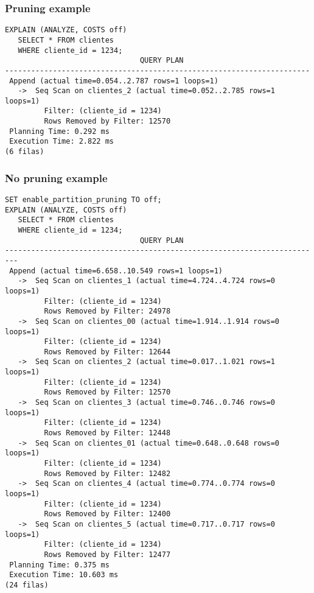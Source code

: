 \begin{frame}[fragile]
  \frametitle{Pruning example}
\footnotesize
\begin{lstlisting}
EXPLAIN (ANALYZE, COSTS off)
   SELECT * FROM clientes
   WHERE cliente_id = 1234;
                               QUERY PLAN                               
----------------------------------------------------------------------
 Append (actual time=0.054..2.787 rows=1 loops=1)
   ->  Seq Scan on clientes_2 (actual time=0.052..2.785 rows=1 loops=1)
         Filter: (cliente_id = 1234)
         Rows Removed by Filter: 12570
 Planning Time: 0.292 ms
 Execution Time: 2.822 ms
(6 filas)
\end{lstlisting}
\end{frame}

\begin{frame}[fragile]
  \frametitle{No pruning example}
\footnotesize
\begin{lstlisting}
SET enable_partition_pruning TO off;
EXPLAIN (ANALYZE, COSTS off)
   SELECT * FROM clientes
   WHERE cliente_id = 1234;
                               QUERY PLAN                                
-------------------------------------------------------------------------
 Append (actual time=6.658..10.549 rows=1 loops=1)
   ->  Seq Scan on clientes_1 (actual time=4.724..4.724 rows=0 loops=1)
         Filter: (cliente_id = 1234)
         Rows Removed by Filter: 24978
   ->  Seq Scan on clientes_00 (actual time=1.914..1.914 rows=0 loops=1)
         Filter: (cliente_id = 1234)
         Rows Removed by Filter: 12644
   ->  Seq Scan on clientes_2 (actual time=0.017..1.021 rows=1 loops=1)
         Filter: (cliente_id = 1234)
         Rows Removed by Filter: 12570
   ->  Seq Scan on clientes_3 (actual time=0.746..0.746 rows=0 loops=1)
         Filter: (cliente_id = 1234)
         Rows Removed by Filter: 12448
   ->  Seq Scan on clientes_01 (actual time=0.648..0.648 rows=0 loops=1)
         Filter: (cliente_id = 1234)
         Rows Removed by Filter: 12482
   ->  Seq Scan on clientes_4 (actual time=0.774..0.774 rows=0 loops=1)
         Filter: (cliente_id = 1234)
         Rows Removed by Filter: 12400
   ->  Seq Scan on clientes_5 (actual time=0.717..0.717 rows=0 loops=1)
         Filter: (cliente_id = 1234)
         Rows Removed by Filter: 12477
 Planning Time: 0.375 ms
 Execution Time: 10.603 ms
(24 filas)

\end{lstlisting}
\end{frame}

